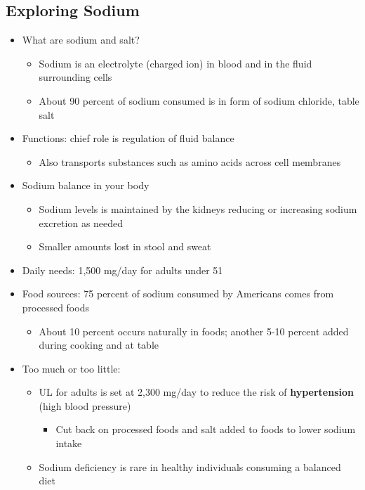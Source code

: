 \documentclass[12pt]{article}
\begin{document}
        \subsection{Exploring Sodium}
            \begin{itemize}
                \item What are sodium and salt?
                    \begin{itemize}
                        \item Sodium is an electrolyte (charged ion) in blood and in the fluid surrounding cells
                        \item About 90 percent of sodium consumed is in form of sodium chloride, table salt
                    \end{itemize}
                \item Functions: chief role is regulation of fluid balance
                    \begin{itemize}
                        \item Also transports substances such as amino acids across cell membranes
                    \end{itemize}
                \item Sodium balance in your body
                    \begin{itemize}
                        \item Sodium levels is maintained by the kidneys reducing or increasing sodium excretion as needed
                        \item Smaller amounts lost in stool and sweat
                    \end{itemize}
                \item Daily needs: 1,500 mg/day for adults under 51
                \item Food sources: 75 percent of sodium consumed by Americans comes from processed foods
                    \begin{itemize}
                        \item About 10 percent occurs naturally in foods; another 5-10 percent added during cooking and at table
                    \end{itemize}
                \item Too much or too little:
                    \begin{itemize}
                        \item UL for adults is set at 2,300 mg/day to reduce the risk of \textbf{hypertension} (high blood pressure)
                            \begin{itemize}
                                \item Cut back on processed foods and salt added to foods to lower sodium intake
                            \end{itemize}
                        \item Sodium deficiency is rare in healthy individuals consuming a balanced diet
                    \end{itemize}
            \end{itemize}
\end{document}
